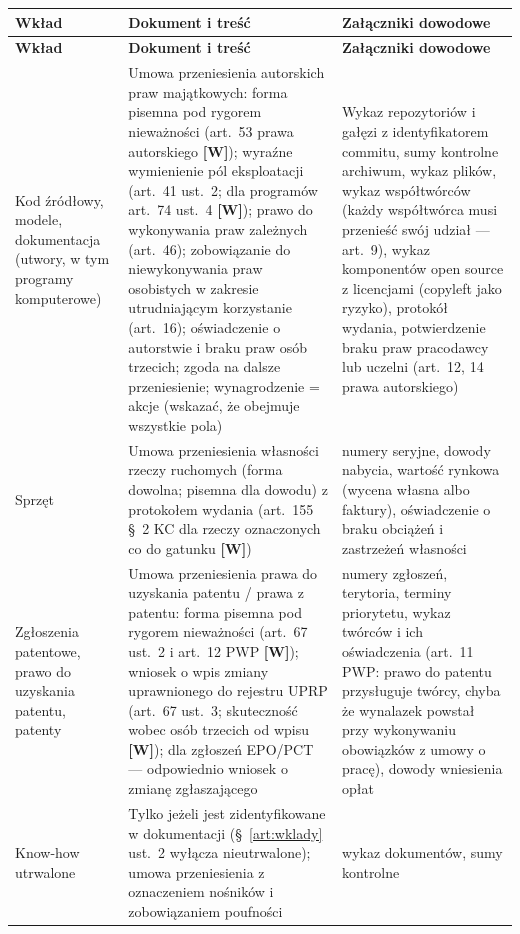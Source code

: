 \documentclass[12pt,a4paper]{report}
\newcommand{\Wiar}[1]{\textbf{[#1]}}
\begin{document}
\begin{longtable}{@{}p{2.6cm} p{6.0cm} p{5.6cm}@{}}
\toprule
\textbf{Wkład} & \textbf{Dokument i treść} & \textbf{Załączniki dowodowe} \\
\midrule
\endfirsthead
\toprule
\textbf{Wkład} & \textbf{Dokument i treść} & \textbf{Załączniki dowodowe} \\
\midrule
\endhead
Kod źródłowy, modele, dokumentacja (utwory, w tym programy komputerowe) & Umowa przeniesienia autorskich praw majątkowych: forma pisemna pod rygorem nieważności (art.~53 prawa autorskiego \Wiar{W}); wyraźne wymienienie pól eksploatacji (art.~41 ust.~2; dla programów art.~74 ust.~4 \Wiar{W}); prawo do wykonywania praw zależnych (art.~46); zobowiązanie do niewykonywania praw osobistych w zakresie utrudniającym korzystanie (art.~16); oświadczenie o autorstwie i braku praw osób trzecich; zgoda na dalsze przeniesienie; wynagrodzenie = akcje (wskazać, że obejmuje wszystkie pola) & Wykaz repozytoriów i gałęzi z identyfikatorem commitu, sumy kontrolne archiwum, wykaz plików, wykaz współtwórców (każdy współtwórca musi przenieść swój udział --- art.~9), wykaz komponentów open source z licencjami (copyleft jako ryzyko), protokół wydania, potwierdzenie braku praw pracodawcy lub uczelni (art.~12, 14 prawa autorskiego) \\
Sprzęt & Umowa przeniesienia własności rzeczy ruchomych (forma dowolna; pisemna dla dowodu) z protokołem wydania (art.~155 §~2 KC dla rzeczy oznaczonych co do gatunku \Wiar{W}) & numery seryjne, dowody nabycia, wartość rynkowa (wycena własna albo faktury), oświadczenie o braku obciążeń i zastrzeżeń własności \\
Zgłoszenia patentowe, prawo do uzyskania patentu, patenty & Umowa przeniesienia prawa do uzyskania patentu / prawa z patentu: forma pisemna pod rygorem nieważności (art.~67 ust.~2 i art.~12 PWP \Wiar{W}); wniosek o wpis zmiany uprawnionego do rejestru UPRP (art.~67 ust.~3; skuteczność wobec osób trzecich od wpisu \Wiar{W}); dla zgłoszeń EPO/PCT --- odpowiednio wniosek o zmianę zgłaszającego & numery zgłoszeń, terytoria, terminy priorytetu, wykaz twórców i ich oświadczenia (art.~11 PWP: prawo do patentu przysługuje twórcy, chyba że wynalazek powstał przy wykonywaniu obowiązków z umowy o pracę), dowody wniesienia opłat \\
Know-how utrwalone & Tylko jeżeli jest zidentyfikowane w dokumentacji (§~\ref{art:wklady} ust.~2 wyłącza nieutrwalone); umowa przeniesienia z oznaczeniem nośników i zobowiązaniem poufności & wykaz dokumentów, sumy kontrolne \\
\bottomrule
\end{longtable}
\end{document}

